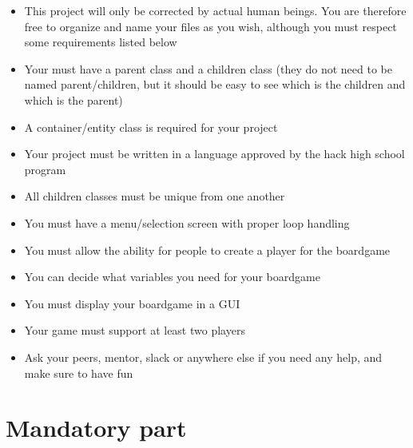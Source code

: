 \documentclass{42-en}
\begin{document}
	    \begin{itemize}
		\item This project will only be corrected by actual human beings.
		You are therefore free to organize and name your files as you wish,
		although you must respect some requirements listed below
		\item Your must have a parent class and a children class (they do not
		need to be named parent/children, but it should be easy to see
		which is the children and which is the parent)
		\item A container/entity class is required for your project
		
				
		
		\item Your project must be written in a language approved by
		the hack high school program
		\item All children classes must be unique from one another
		\item You must have a menu/selection screen with proper loop handling
		\item You must allow the ability for people to create a player for the boardgame
		\item You can decide what variables you need for your boardgame
		\item You must display your boardgame in a GUI
		\item Your game must support at least two players
		\item Ask your peers, mentor, slack or anywhere else if you need
		any help, and make sure to have fun\\
	\end{itemize}



\chapter{Mandatory part}
\end{document}
